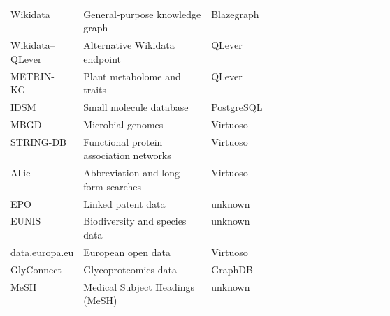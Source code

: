\begin{table}[!t]
\begin{tabularx}{\linewidth}{
    L{0.16\linewidth}
    Y
    L{0.22\linewidth}
    L{0.25\linewidth}
}
Wikidata~\cite{vrandecic2014wikidata} 
& General-purpose knowledge graph 
& Blazegraph
&  \\

Wikidata--QLever 
& Alternative Wikidata endpoint 
& QLever
&  \\

METRIN-KG~\cite{Tandon2026METRIN} 
& Plant metabolome and traits
& QLever
&  \\

IDSM~\cite{Galgonek2021ChemWebRDF} 
& Small molecule database
& PostgreSQL
&  \\

MBGD~\cite{Uchiyama2019MBGD} 
& Microbial genomes
& Virtuoso
&  \\

STRING-DB~\cite{Szklarczyk2025STRING} 
& Functional protein association networks 
& Virtuoso
&  \\

Allie~\cite{Yamamoto2011Allie} 
& Abbreviation and long-form searches 
& Virtuoso
&  \\

EPO~\cite{Kracker2018} 
& Linked patent data
& unknown
&  \\

EUNIS
& Biodiversity and species data
& unknown
&  \\

data.europa.eu 
& European open data
& Virtuoso
&  \\

GlyConnect~\cite{Alocci2019GlyConnect} 
& Glycoproteomics data 
& GraphDB
&  \\

MeSH~\cite{bushman2015} 
& Medical Subject Headings (MeSH)
& unknown
&  \\


\end{tabularx}
\end{table}
